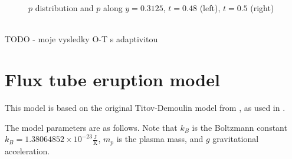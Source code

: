 \begin{figure}[H]
\centering
{}\hspace{12mm}
\caption{$p$ distribution and $p$ along $y = 0.3125$, $t = 0.48$ (left), $t = 0.5$ (right)}
\label{figure:myOt3}
\end{figure}
\vspace{-8mm}

\ \\
TODO - moje vysledky O-T s adaptivitou\\

\section{Flux tube eruption model}
This model is based on the original Titov-Demoulin model from \cite{td}, as used in \cite{miraClanek}.

The model parameters are as follows. Note that $k_B$ is the Boltzmann constant $k_B = 1.38064852 \times 10^{-23} \frac{\mathrm{J}}{\mathrm{K}}$, $m_p$ is the plasma mass, and $g$ gravitational acceleration.


